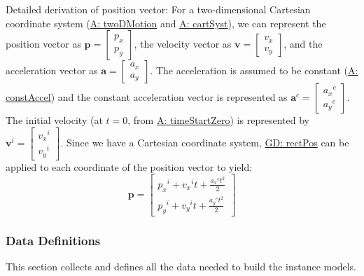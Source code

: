 \documentclass[12pt]{article}
\begin{document}
Detailed derivation of position vector:
For a two-dimensional Cartesian coordinate system (\hyperref[twoDMotion]{A: twoDMotion} and \hyperref[cartSyst]{A: cartSyst}), we can represent the position vector as $\mathbf{p}=\begin{bmatrix}
{p_{x}}\\
{p_{y}}
\end{bmatrix}$, the velocity vector as $\mathbf{v}=\begin{bmatrix}
{v_{x}}\\
{v_{y}}
\end{bmatrix}$, and the acceleration vector as $\mathbf{a}=\begin{bmatrix}
{a_{x}}\\
{a_{y}}
\end{bmatrix}$. The acceleration is assumed to be constant (\hyperref[constAccel]{A: constAccel}) and the constant acceleration vector is represented as ${\mathbf{a}^{c}}=\begin{bmatrix}
{{a_{x}}^{c}}\\
{{a_{y}}^{c}}
\end{bmatrix}$. The initial velocity (at $t=0$, from \hyperref[timeStartZero]{A: timeStartZero}) is represented by ${\mathbf{v}^{i}}=\begin{bmatrix}
{{v_{x}}^{i}}\\
{{v_{y}}^{i}}
\end{bmatrix}$. Since we have a Cartesian coordinate system, \hyperref[GD:rectPos]{GD: rectPos} can be applied to each coordinate of the position vector to yield:
\begin{displaymath}
\mathbf{p}=\begin{bmatrix}
{{p_{x}}^{i}}+{{v_{x}}^{i}} t+\frac{{{a_{x}}^{c}} t^{2}}{2}\\
{{p_{y}}^{i}}+{{v_{y}}^{i}} t+\frac{{{a_{y}}^{c}} t^{2}}{2}
\end{bmatrix}
\end{displaymath}
\subsubsection{Data Definitions}
\label{Sec:DDs}
This section collects and defines all the data needed to build the instance models.
\par~
\end{document}

